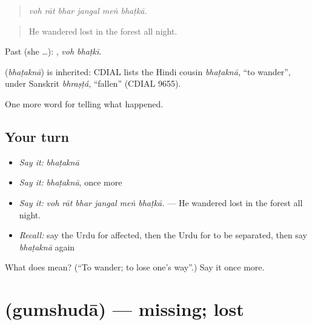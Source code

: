 \begin{quote}
     
\end{quote}

\begin{quote}
\emph{voh rāt bhar jangal meṅ bhaṭkā.}
\end{quote}

\begin{quote}
He wandered lost in the forest all night.
\end{quote}

Past (she …):  , \emph{voh bhaṭkī}.

\begin{cousinweb}
\textbf{} (\emph{bhaṭaknā}) is inherited: CDIAL lists the Hindi cousin \emph{bhaṭaknā}, \textquotedblleft{}to wander\textquotedblright{}, under Sanskrit \emph{bhraṣṭá}, \textquotedblleft{}fallen\textquotedblright{} (CDIAL 9655).
\end{cousinweb}

\begin{grammarlens}[title={What you've built}]
One more word for telling what happened.
\end{grammarlens}

\subsection*{Your turn}
\begin{itemize}
\raggedright
  \item \emph{Say it:} \emph{bhaṭaknā}
  \item \emph{Say it:} \emph{bhaṭaknā}, once more
  \item \emph{Say it:} \emph{voh rāt bhar jangal meṅ bhaṭkā.} — He wandered lost in the forest all night.
  \item \emph{Recall:} say the Urdu for affected, then the Urdu for to be separated, then say \emph{bhaṭaknā} again
\end{itemize}

\begin{tcolorbox}[breakable,colback=teal!4,colframe=teal!35!black,title={Before you move on}]
What does  mean? (\textquotedblleft{}To wander; to lose one's way\textquotedblright{}.) Say it once more.
\end{tcolorbox}
\section[\texorpdfstring{\ur{گمشدہ} (gumshudā)}{گمشدہ (gumshudā)}]{ (gumshudā) — missing; lost}

